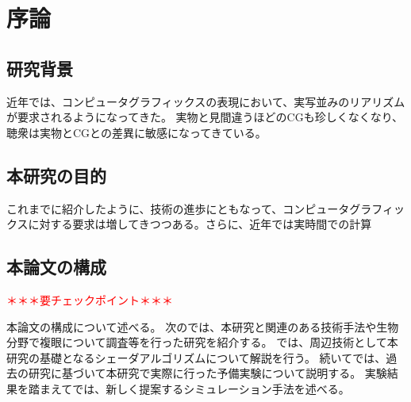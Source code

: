 \chapter{序論}
\label{CBegin}

\section{研究背景}
\label{SBackground}

近年では、コンピュータグラフィックスの表現において、実写並みのリアリズムが要求されるようになってきた。
実物と見間違うほどのCGも珍しくなくなり、聴衆は実物とCGとの差異に敏感になってきている。

\section{本研究の目的}
\label{SObjective}

これまでに紹介したように、技術の進歩にともなって、コンピュータグラフィックスに対する要求は増してきつつある。さらに、近年では実時間での計算

\section{本論文の構成}
\label{SPaper_structure}

\textcolor{red}{＊＊＊要チェックポイント＊＊＊}

本論文の構成について述べる。
次のでは、本研究と関連のある技術手法や生物分野で複眼について調査等を行った研究を紹介する。
では、周辺技術として本研究の基礎となるシェーダアルゴリズムについて解説を行う。
続いてでは、過去の研究に基づいて本研究で実際に行った予備実験について説明する。
実験結果を踏まえてでは、新しく提案するシミュレーション手法を述べる。
